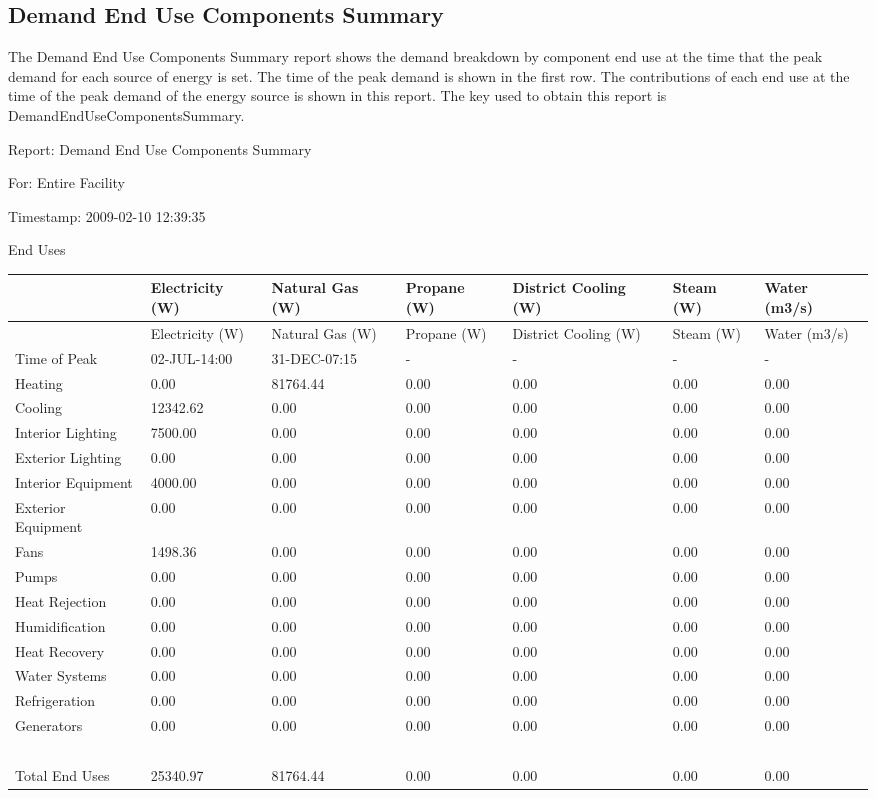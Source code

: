 \subsection{Demand End Use Components Summary}\label{demand-end-use-components-summary}

The Demand End Use Components Summary report shows the demand breakdown by component end use at the time that the peak demand for each source of energy is set. The time of the peak demand is shown in the first row. The contributions of each end use at the time of the peak demand of the energy source is shown in this report. The key used to obtain this report is DemandEndUseComponentsSummary.

Report: Demand End Use Components Summary

For: Entire Facility

Timestamp: 2009-02-10 12:39:35

End Uses

{\scriptsize
\begin{longtable}[c]{>{\raggedright}p{0.85in}>{\raggedright}p{0.85in}>{\raggedright}p{0.85in}>{\raggedright}p{0.85in}>{\raggedright}p{0.85in}>{\raggedright}p{0.85in}>{\raggedright}p{0.85in}}
\toprule 
~ & Electricity (W) & Natural Gas (W) & Propane (W) & District Cooling (W) & Steam (W) & Water (m3/s) \tabularnewline
\midrule
\endfirsthead

\toprule 
~ & Electricity (W) & Natural Gas (W) & Propane (W) & District Cooling (W) & Steam (W) & Water (m3/s) \tabularnewline
\midrule
\endhead

Time of Peak & 02-JUL-14:00 & 31-DEC-07:15 & - & - & - & - \tabularnewline
Heating & 0.00 & 81764.44 & 0.00 & 0.00 & 0.00 & 0.00 \tabularnewline
Cooling & 12342.62 & 0.00 & 0.00 & 0.00 & 0.00 & 0.00 \tabularnewline
Interior Lighting & 7500.00 & 0.00 & 0.00 & 0.00 & 0.00 & 0.00 \tabularnewline
Exterior Lighting & 0.00 & 0.00 & 0.00 & 0.00 & 0.00 & 0.00 \tabularnewline
Interior Equipment & 4000.00 & 0.00 & 0.00 & 0.00 & 0.00 & 0.00 \tabularnewline
Exterior Equipment & 0.00 & 0.00 & 0.00 & 0.00 & 0.00 & 0.00 \tabularnewline
Fans & 1498.36 & 0.00 & 0.00 & 0.00 & 0.00 & 0.00 \tabularnewline
Pumps & 0.00 & 0.00 & 0.00 & 0.00 & 0.00 & 0.00 \tabularnewline
Heat Rejection & 0.00 & 0.00 & 0.00 & 0.00 & 0.00 & 0.00 \tabularnewline
Humidification & 0.00 & 0.00 & 0.00 & 0.00 & 0.00 & 0.00 \tabularnewline
Heat Recovery & 0.00 & 0.00 & 0.00 & 0.00 & 0.00 & 0.00 \tabularnewline
Water Systems & 0.00 & 0.00 & 0.00 & 0.00 & 0.00 & 0.00 \tabularnewline
Refrigeration & 0.00 & 0.00 & 0.00 & 0.00 & 0.00 & 0.00 \tabularnewline
Generators & 0.00 & 0.00 & 0.00 & 0.00 & 0.00 & 0.00 \tabularnewline
~ & ~ & ~ & ~ & ~ & ~ & ~ \tabularnewline
Total End Uses & 25340.97 & 81764.44 & 0.00 & 0.00 & 0.00 & 0.00 \tabularnewline
\bottomrule
\end{longtable}}

